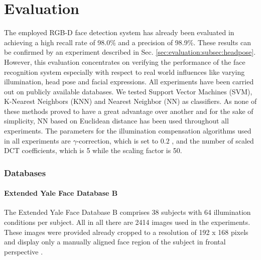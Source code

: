 
\chapter{Evaluation}
\label{sec:evaluation}
The employed RGB-D face detection system has already been evaluated in \cite{Fischer2010} achieving a high recall rate of 98.0\% and a precision of 98.9\%. These results can be confirmed by an experiment described in Sec. \ref{sec:evaluation:subsec:headpose}.
However, this evaluation concentrates on verifying the performance of the face recognition system especially with respect to real world influences like varying illumination, head pose and facial expressions.
All experiments have been carried out on publicly available databases.
We tested Support Vector Machines (SVM), K-Nearest Neighbors (KNN) and Nearest Neighbor (NN) as classifiers.
As none of these methods proved to have a great advantage over another and for the sake of simplicity, NN based on Euclidean distance has been used throughout all experiments.
The parameters for the illumination compensation algorithms used in all experiments are $\gamma$-correction, which is set to $0.2$ \cite{Tan2010}, and the number of scaled DCT coefficients, which is 5 while the scaling factor is 50.

\subsection{Databases}
\subsubsection{Extended Yale Face Database B}
The Extended Yale Face Database B \cite{Georghiades01} comprises 38 subjects with 64 illumination conditions per subject.
All in all there are 2414 images used in the experiments.
These images were provided already cropped to a resolution of 192 x 168 pixels and display only a manually aligned face region of the subject in frontal perspective \cite{Lee05}.

